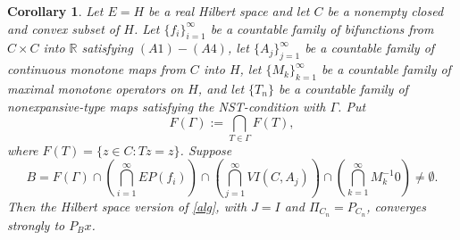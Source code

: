 \documentclass[10pt,a4paper]{amsart}
\newtheorem{corollary}[theorem]{Corollary}
\numberwithin{equation}{section}
\begin{document}
\begin{corollary}\label{hilbert}
Let $E=H$ be a real Hilbert space and let $C$ be a nonempty closed and convex subset of $H$. Let $\{f_i\}_{i=1}^{\infty}$ be a countable family of bifunctions from $C\times C$ into $\mathbb{R}$ satisfying $(A1)-(A4)$, let $\{A_j\}_{j=1}^{\infty}$ be a countable family of continuous monotone maps from $C$ into $H$, let $\{M_k\}_{k=1}^{\infty}$ be a countable family of maximal monotone operators on $H$, and let $\{T_n\}$ be a countable family of nonexpansive-type maps satisfying the NST-condition with $\Gamma$. Put
\[
F(\Gamma):=\bigcap_{T\in\Gamma}F(T),
\]
where $F(T)=\{z\in C:Tz=z\}$. Suppose
\[
B=F(\Gamma)\cap\left(\bigcap_{i=1}^{\infty}EP(f_i)\right)
\cap\left(\bigcap_{j=1}^{\infty}VI(C,A_j)\right)
\cap\left(\bigcap_{k=1}^{\infty}M_k^{-1}0\right)\neq\emptyset.
\]
Then the Hilbert space version of \eqref{alg}, with $J=I$ and $\Pi_{C_n}=P_{C_n}$, converges strongly to $P_Bx$.
\end{corollary}
\end{document}

